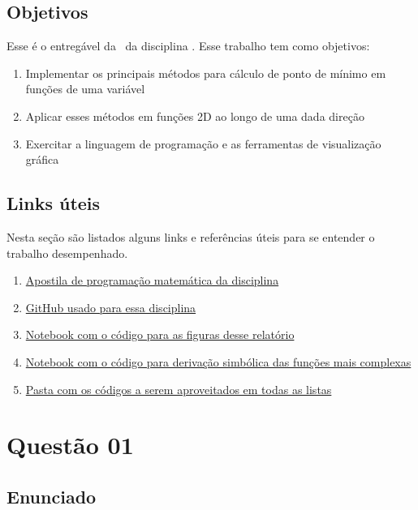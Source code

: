 \documentclass[10pt, a4paper]{article}
\begin{document}
\subsection{Objetivos}

Esse é o entregável da \TITLE \ da disciplina \DISCIPLINE. Esse trabalho tem como objetivos:

\begin{enumerate}
  \item Implementar os principais métodos para cálculo de ponto de mínimo em funções de uma variável
  \item Aplicar esses métodos em funções 2D ao longo de uma dada direção
  \item Exercitar a linguagem de programação e as ferramentas de visualização gráfica
\end{enumerate}

\subsection{Links úteis}\label{links}

Nesta seção são listados alguns links e referências úteis para se entender o trabalho desempenhado.

\begin{enumerate}
  \item \href{https://web.tecgraf.puc-rio.br/~ivan/MEC2403/ProgMatematica_VazPereiraMenezes-Ago2012.pdf}{Apostila de programação matemática da disciplina}
  \item \href{https://github.com/prj-phcp/MEC2403_Activities}{GitHub usado para essa disciplina}
  \item \href{https://github.com/prj-phcp/MEC2403_Activities/blob/master/Trabalho1/Trabalho1.ipynb}{Notebook com o código para as figuras desse relatório}
  \item \href{https://github.com/prj-phcp/MEC2403_Activities/blob/master/Trabalho1/Derivadas.ipynb}{Notebook com o código para derivação simbólica das funções mais complexas}
  \item \href{https://github.com/prj-phcp/MEC2403_Activities/blob/master/packages}{Pasta com os códigos a serem aproveitados em todas as listas}
\end{enumerate}

\section{Questão 01}\label{sec:q01}

\subsection{Enunciado}
\end{document}
